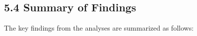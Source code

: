 
\subsection*{5.4 Summary of Findings}
The key findings from the analyses are summarized as follows:

